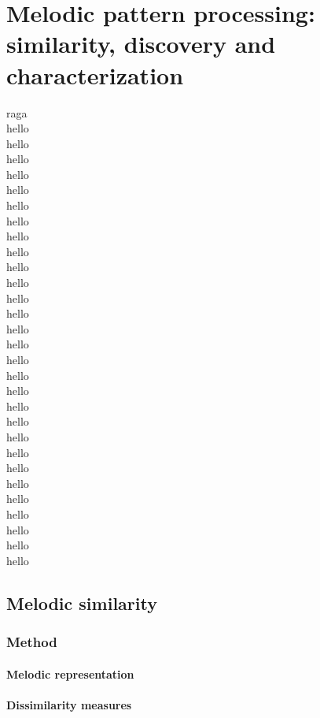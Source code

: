 
\chapter{Melodic pattern processing: similarity, discovery and characterization}

\gls{raga}\\
hello\\
hello\\
hello\\
hello\\
hello\\
hello\\
hello\\
hello\\
hello\\
hello\\
hello\\
hello\\
hello\\
hello\\
hello\\
hello\\
hello\\
hello\\
hello\\
hello\\
hello\\
hello\\
hello\\
hello\\
hello\\
hello\\
hello\\
hello\\
hello\\

\section{Melodic similarity}

\subsection{Method}
\subsubsection{Melodic representation}
\subsubsection{Dissimilarity measures}
